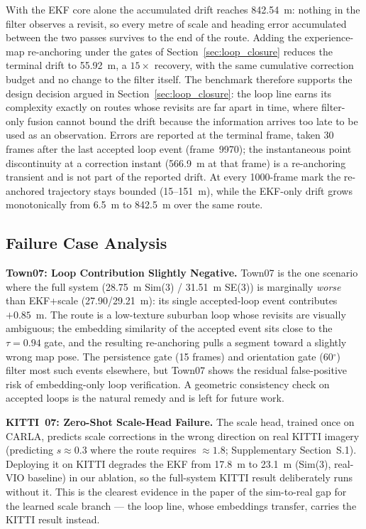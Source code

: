 With the EKF core alone the accumulated drift reaches 842.54~m: nothing in the filter observes a revisit, so every metre of scale and heading error accumulated between the two passes survives to the end of the route. Adding the experience-map re-anchoring under the gates of Section~\ref{sec:loop_closure} reduces the terminal drift to 55.92~m, a $15\times$ recovery, with the same cumulative correction budget and no change to the filter itself. The benchmark therefore supports the design decision argued in Section~\ref{sec:loop_closure}: the loop line earns its complexity exactly on routes whose revisits are far apart in time, where filter-only fusion cannot bound the drift because the information arrives too late to be used as an observation. Errors are reported at the terminal frame, taken 30 frames after the last accepted loop event (frame~9970); the instantaneous point discontinuity at a correction instant (566.9~m at that frame) is a re-anchoring transient and is not part of the reported drift. At every 1000-frame mark the re-anchored trajectory stays bounded (15--151~m), while the EKF-only drift grows monotonically from 6.5~m to 842.5~m over the same route.

\subsection{Failure Case Analysis}
\label{sec:failure_analysis}

\textbf{Town07: Loop Contribution Slightly Negative.} Town07 is the one scenario where the full system (28.75~m Sim(3) / 31.51~m SE(3)) is marginally \emph{worse} than EKF+scale (27.90/29.21~m): its single accepted-loop event contributes $+0.85$~m. The route is a low-texture suburban loop whose revisits are visually ambiguous; the embedding similarity of the accepted event sits close to the $\tau=0.94$ gate, and the resulting re-anchoring pulls a segment toward a slightly wrong map pose. The persistence gate (15 frames) and orientation gate (60$^\circ$) filter most such events elsewhere, but Town07 shows the residual false-positive risk of embedding-only loop verification. A geometric consistency check on accepted loops is the natural remedy and is left for future work.

\textbf{KITTI~07: Zero-Shot Scale-Head Failure.} The scale head, trained once on CARLA, predicts scale corrections in the wrong direction on real KITTI imagery (predicting $s\approx0.3$ where the route requires $\approx1.8$; Supplementary Section~S.1). Deploying it on KITTI degrades the EKF from 17.8~m to 23.1~m (Sim(3), real-VIO baseline) in our ablation, so the full-system KITTI result deliberately runs without it. This is the clearest evidence in the paper of the sim-to-real gap for the learned scale branch --- the loop line, whose embeddings transfer, carries the KITTI result instead.

